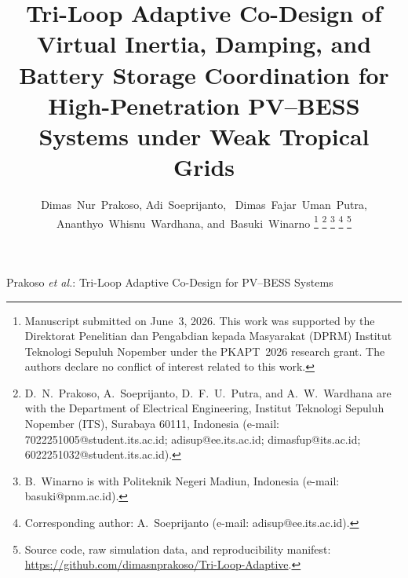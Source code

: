 \documentclass[journal]{IEEEtran}
\begin{document}
\title{Tri-Loop Adaptive Co-Design of Virtual Inertia, Damping, and
Battery Storage Coordination for High-Penetration PV--BESS Systems
under Weak Tropical Grids}

\author{Dimas~Nur~Prakoso,
        Adi~Soeprijanto,~
        Dimas~Fajar~Uman~Putra,
        Ananthyo~Whisnu~Wardhana,
        and~Basuki~Winarno%
\thanks{Manuscript submitted on June~3, 2026. This work was supported by the Direktorat Penelitian dan Pengabdian kepada Masyarakat (DPRM) Institut Teknologi Sepuluh Nopember under the PKAPT~2026 research grant. The authors declare no conflict of interest related to this work.}%
\thanks{D.~N.~Prakoso, A.~Soeprijanto, D.~F.~U.~Putra, and A.~W.~Wardhana are with the Department of Electrical Engineering, Institut Teknologi Sepuluh Nopember (ITS), Surabaya 60111, Indonesia (e-mail: 7022251005@student.its.ac.id; adisup@ee.its.ac.id; dimasfup@its.ac.id; 6022251032@student.its.ac.id).}%
\thanks{B.~Winarno is with Politeknik Negeri Madiun, Indonesia (e-mail: basuki@pnm.ac.id).}%
\thanks{Corresponding author: A.~Soeprijanto (e-mail: adisup@ee.its.ac.id).}%
\thanks{Source code, raw simulation data, and reproducibility manifest:\\\url{https://github.com/dimasnprakoso/Tri-Loop-Adaptive}.}}


%
{Prakoso \MakeLowercase{\textit{et al.}}: Tri-Loop Adaptive Co-Design for PV--BESS Systems}

\maketitle
\end{document}
